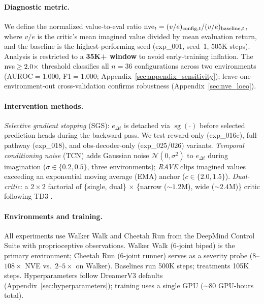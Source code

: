\paragraph{Diagnostic metric.}
\label{sec:metrics}
 We define the normalized value-to-eval ratio $\mathrm{nve}_t = (v/e)_{\text{config},t} / (v/e)_{\text{baseline},t}$, where $v/e$ is the critic's mean imagined value divided by mean evaluation return, and the baseline is the highest-performing seed (exp\_001, seed~1, 505K steps). Analysis is restricted to a \textbf{35K+ window} to avoid early-training inflation. The $\mathrm{nve} \geq 2.0\times$ threshold classifies all $n{=}36$ configurations across two environments (AUROC${=}1.000$, F1${=}1.000$; Appendix~\ref{sec:appendix_sensitivity}); leave-one-environment-out cross-validation confirms robustness (Appendix~\ref{sec:nve_loeo}).

\paragraph{Intervention methods.}
\label{sec:sgs_method}
 \emph{Selective gradient stopping} (SGS): $e_{\Delta t}$ is detached via $\operatorname{sg}(\cdot)$ before selected prediction heads during the backward pass. We test reward-only (exp\_016e), full-pathway (exp\_018), and obs-decoder-only (exp\_025/026) variants. \emph{Temporal conditioning noise} (TCN) adds Gaussian noise $\mathcal{N}(0, \sigma^2)$ to $e_{\Delta t}$ during imagination ($\sigma \in \{0.2, 0.5\}$, three environments); \emph{RAVE} clips imagined values exceeding an exponential moving average (EMA) anchor ($c \in \{2.0, 1.5\}$). \emph{Dual-critic}: a $2{\times}2$ factorial of \{single, dual\} $\times$ \{narrow (${\sim}1.2$M), wide (${\sim}2.4$M)\} critic following TD3 \citep{fujimoto2018td3}.
\label{sec:forward_pass_method}
\label{sec:dual_critic_method}

\paragraph{Environments and training.}
\label{sec:env_details}
 All experiments use Walker Walk and Cheetah Run from the DeepMind Control Suite \citep{tassa2018dmcontrol} with proprioceptive observations. Walker Walk (6-joint biped) is the primary environment; Cheetah Run (6-joint runner) serves as a severity probe ($8$--$108\times$ NVE vs.\ $2$--$5\times$ on Walker). Baselines run 500K steps; treatments 105K steps. Hyperparameters follow DreamerV3 defaults \citep{hafner2025dreamerv3} (Appendix~\ref{sec:hyperparameters}); training uses a single GPU (${\sim}80$ GPU-hours total).

